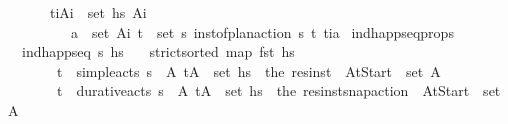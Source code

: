 \begin{isabellebody}
\ \ \ \ \ \ {\isasymand}\ {\isacharparenleft}{\kern0pt}{\isasymforall}{\isacharparenleft}{\kern0pt}t\isactrlsub i{\isacharcomma}{\kern0pt}A\isactrlsub i{\isacharparenright}{\kern0pt}\ {\isasymin}\ set\ hs{\isachardot}{\kern0pt}\ A\isactrlsub i\ {\isasymnoteq}\ {\isacharbrackleft}{\kern0pt}{\isacharbrackright}{\kern0pt}\ {\isasymand}\isanewline
\ \ \ \ \ \ \ \ \ \ {\isacharparenleft}{\kern0pt}{\isasymforall}a\ {\isasymin}\ set\ A\isactrlsub i{\isachardot}{\kern0pt}\ {\isasymexists}{\isacharparenleft}{\kern0pt}t\isactrlsub {\isasympi}{\isacharcomma}{\kern0pt}{\isasympi}{\isacharparenright}{\kern0pt}\ {\isasymin}\ set\ {\isasympi}s{\isachardot}{\kern0pt}\ inst{\isacharunderscore}{\kern0pt}of{\isacharunderscore}{\kern0pt}plan{\isacharunderscore}{\kern0pt}action\ {\isasympi}s\ {\isacharparenleft}{\kern0pt}t\isactrlsub {\isasympi}{\isacharcomma}{\kern0pt}{\isasympi}{\isacharparenright}{\kern0pt}\ {\isacharparenleft}{\kern0pt}t\isactrlsub i{\isacharcomma}{\kern0pt}a{\isacharparenright}{\kern0pt}{\isacharparenright}{\kern0pt}{\isacharparenright}{\kern0pt}{\isacharparenright}{\kern0pt}{\isachardoublequoteclose}\isanewline
\isanewline
{}\isamarkupfalse%
\ ind{\isacharunderscore}{\kern0pt}happ{\isacharunderscore}{\kern0pt}seq{\isacharunderscore}{\kern0pt}props{\isacharcolon}{\kern0pt}\isanewline
\ \ \ {\isachardoublequoteopen}ind{\isacharunderscore}{\kern0pt}happ{\isacharunderscore}{\kern0pt}seq\ {\isasympi}s\ hs{\isachardoublequoteclose}\isanewline
\ \ \ {\isachardoublequoteopen}strict{\isacharunderscore}{\kern0pt}sorted\ {\isacharparenleft}{\kern0pt}map\ fst\ hs{\isacharparenright}{\kern0pt}{\isachardoublequoteclose}\isanewline
\ \ \ \ \ \ \ \ {\isachardoublequoteopen}{\isacharparenleft}{\kern0pt}t\isactrlsub {\isasympi}{\isacharcomma}{\kern0pt}{\isasympi}{\isacharparenright}{\kern0pt}\ {\isasymin}\ simple{\isacharunderscore}{\kern0pt}acts\ {\isasympi}s\ {\isasymLongrightarrow}\ {\isasymexists}A{\isachardot}{\kern0pt}\ {\isacharparenleft}{\kern0pt}t\isactrlsub {\isasympi}{\isacharcomma}{\kern0pt}A{\isacharparenright}{\kern0pt}\ {\isasymin}\ set\ hs\ {\isasymand}\ the\ {\isacharparenleft}{\kern0pt}res{\isacharunderscore}{\kern0pt}inst\ {\isasympi}\ At{\isacharunderscore}{\kern0pt}Start{\isacharparenright}{\kern0pt}\ {\isasymin}\ set\ A{\isachardoublequoteclose}\isanewline
\ \ \ \ \ \ \ \ {\isachardoublequoteopen}{\isacharparenleft}{\kern0pt}t\isactrlsub {\isasympi}{\isacharcomma}{\kern0pt}{\isasympi}{\isacharparenright}{\kern0pt}\ {\isasymin}\ durative{\isacharunderscore}{\kern0pt}acts\ {\isasympi}s\ {\isasymLongrightarrow}\ {\isasymexists}A{\isachardot}{\kern0pt}\ {\isacharparenleft}{\kern0pt}t\isactrlsub {\isasympi}{\isacharcomma}{\kern0pt}A{\isacharparenright}{\kern0pt}\ {\isasymin}\ set\ hs\ {\isasymand}\ the\ {\isacharparenleft}{\kern0pt}res{\isacharunderscore}{\kern0pt}inst{\isacharunderscore}{\kern0pt}snap{\isacharunderscore}{\kern0pt}action\ {\isasympi}\ At{\isacharunderscore}{\kern0pt}Start{\isacharparenright}{\kern0pt}\ {\isasymin}\ set\ A{\isachardoublequoteclose}\isanewline

\end{isabellebody}
